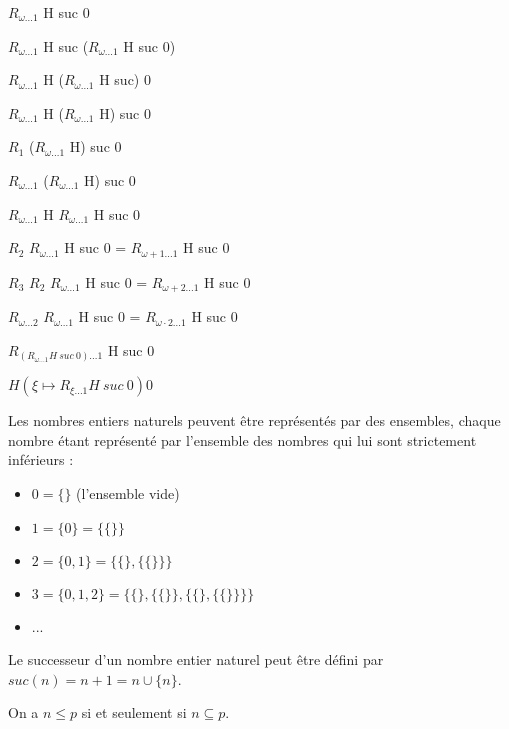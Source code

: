 \documentclass[12pt]{beamer}
\begin{document}
\begin{frame}

$R_{\omega \ldots 1}$ H suc 0

$R_{\omega \ldots 1}$ H suc ($R_{\omega \ldots 1}$ H suc 0) 

$R_{\omega \ldots 1}$ H ($R_{\omega \ldots 1}$ H suc) 0 

$R_{\omega \ldots 1}$ H ($R_{\omega \ldots 1}$ H) suc 0 

$R_1$ ($R_{\omega \ldots 1}$ H) suc 0 

$R_{\omega \ldots 1}$ ($R_{\omega \ldots 1}$ H) suc 0 

$R_{\omega \ldots 1}$ H $R_{\omega \ldots 1}$ H suc 0 

$R_2$ $R_{\omega \ldots 1}$ H suc 0 = $R_{\omega+1 \ldots 1}$ H suc 0

$R_3$ $R_2$ $R_{\omega \ldots 1}$ H suc 0 = $R_{\omega+2 \ldots 1}$ H suc 0

$R_{\omega \ldots 2}$ $R_{\omega \ldots 1}$ H suc 0 = $R_{\omega \cdot 2 \ldots 1}$ H suc 0

$R_{(R_{\omega \ldots 1} H\ suc\ 0) \ldots 1}$ H suc 0

\( H (\xi \mapsto R_{\xi \ldots 1} H\ suc\ 0) 0 \)

\end{frame}
\begin{frame}

Les nombres entiers naturels peuvent être représentés par des ensembles, chaque nombre étant représenté par l'ensemble des nombres qui lui sont strictement inférieurs :

\begin{itemize}
     \setlength{\itemsep}{1pt}
     \setlength{\parskip}{0pt}
     \setlength{\parsep}{0pt}
\item \( 0 = \lbrace\rbrace \) (l'ensemble vide)
\item \( 1 = \lbrace 0 \rbrace = \lbrace\lbrace\rbrace\rbrace \)
\item \( 2 = \lbrace 0, 1 \rbrace = \lbrace\lbrace\rbrace,\lbrace\lbrace\rbrace\rbrace\rbrace \)
\item \( 3 = \lbrace 0, 1, 2 \rbrace = \lbrace\lbrace\rbrace,\lbrace\lbrace\rbrace\rbrace,\lbrace\lbrace\rbrace,\lbrace\lbrace\rbrace\rbrace\rbrace\rbrace \)
\item ...
\end{itemize}

Le successeur d'un nombre entier naturel peut être défini par \( suc(n) = n+1 = n \cup \lbrace n \rbrace \).

On a \( n \leq p \) si et seulement si \( n \subseteq p \).

\end{frame}
\end{document}

